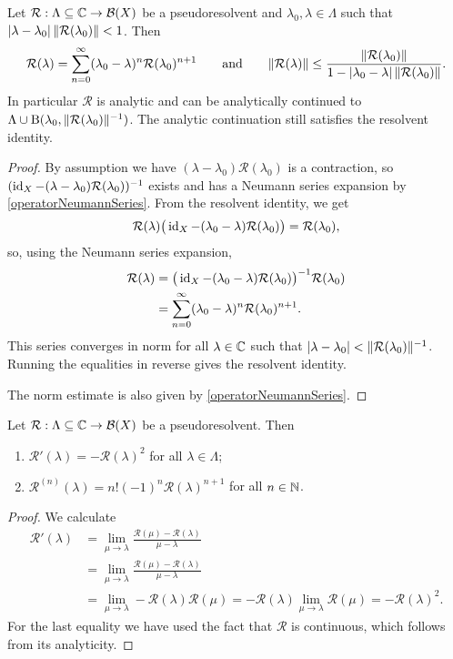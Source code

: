\begin{proposition} \label{firstNeumannSeries}
Let $\mathcal{R}:\Lambda \subseteq \mathbb{C} \to \operatorname{\mathcal{B}}(X)$ be a pseudoresolvent and $\lambda_0,\lambda\in\Lambda$ such that $|\lambda-\lambda_0|\,\lVert\mathcal{R}(\lambda_0)\rVert < 1$. Then
\[ \mathcal{R}(\lambda) = \sum_{n=0}^\infty(\lambda_0 - \lambda)^n \mathcal{R}(\lambda_0)^{n+1} \qquad\text{and}\qquad \lVert\mathcal{R}(\lambda)\rVert \leq \frac{\lVert\mathcal{R}(\lambda_0)\rVert}{1 - |\lambda_0-\lambda|\,\lVert\mathcal{R}(\lambda_0)\rVert}. \]
In particular $\mathcal{R}$ is analytic and can be analytically continued to $\Lambda \cup \operatorname{B}(\lambda_0, \lVert\mathcal{R}(\lambda_0)\rVert^{-1})$. The analytic continuation still satisfies the resolvent identity.
\end{proposition}
\begin{proof}
By assumption we have $(\lambda - \lambda_0)\mathcal{R}(\lambda_0)$ is a contraction, so $(\operatorname{id}_X - (\lambda - \lambda_0)\mathcal{R}(\lambda_0))^{-1}$ exists and has a Neumann series expansion by \ref{operatorNeumannSeries}. From the resolvent identity, we get
\[ \mathcal{R}(\lambda)\big(\operatorname{id}_X - (\lambda_0 - \lambda)\mathcal{R}(\lambda_0)\big) = \mathcal{R}(\lambda_0), \]
so, using the Neumann series expansion,
\begin{align*}
\mathcal{R}(\lambda) &= \big(\operatorname{id}_X - (\lambda_0 - \lambda)\mathcal{R}(\lambda_0)\big)^{-1}\mathcal{R}(\lambda_0) \\
&= \sum_{n=0}^\infty(\lambda_0 - \lambda)^n \mathcal{R}(\lambda_0)^{n+1}.
\end{align*}
This series converges in norm for all $\lambda\in \mathbb{C}$ such that $|\lambda-\lambda_0| < \lVert\mathcal{R}(\lambda_0)\rVert^{-1}$. Running the equalities in reverse gives the resolvent identity.

The norm estimate is also given by \ref{operatorNeumannSeries}.
\end{proof}
\begin{corollary}
Let $\mathcal{R}:\Lambda \subseteq \mathbb{C} \to \operatorname{\mathcal{B}}(X)$ be a pseudoresolvent. Then
\begin{enumerate}
\item $\mathcal{R}'(\lambda) = -\mathcal{R}(\lambda)^2$ for all $\lambda\in\Lambda$;
\item $\mathcal{R}^{(n)}(\lambda) = n!(-1)^n \mathcal{R}(\lambda)^{n+1}$ for all $n\in \mathbb{N}$.
\end{enumerate}
\end{corollary}
\begin{proof}
We calculate
\begin{align*}
\mathcal{R}'(\lambda) &= \lim_{\mu\to\lambda} \frac{\mathcal{R}(\mu) - \mathcal{R}(\lambda)}{\mu-\lambda} \\
&= \lim_{\mu\to\lambda} \frac{\mathcal{R}(\mu) - \mathcal{R}(\lambda)}{\mu-\lambda} \\
&= \lim_{\mu\to\lambda} -\mathcal{R}(\lambda)\mathcal{R}(\mu) = -\mathcal{R}(\lambda)\lim_{\mu\to\lambda} \mathcal{R}(\mu) = -\mathcal{R}(\lambda)^2.
\end{align*}
For the last equality we have used the fact that $\mathcal{R}$ is continuous, which follows from its analyticity.
\end{proof}

